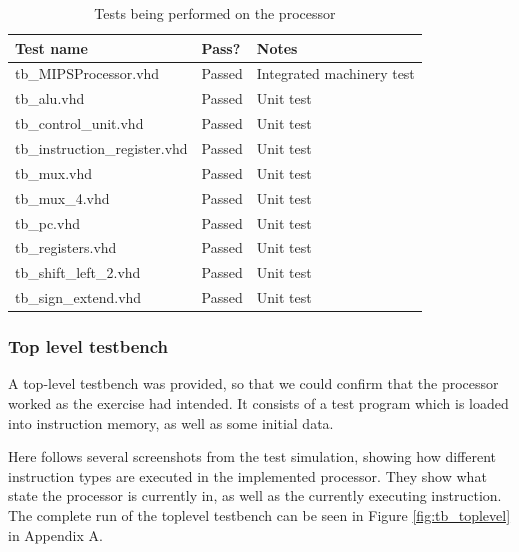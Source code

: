 \begin{table}[ht+]
    \centering
    \begin{tabular}{|l|l|l|}
        \hline
        \textbf{Test name}            & \textbf{Pass?} & \textbf{Notes}            \\ \hline
        tb\_MIPSProcessor.vhd         & Passed         & Integrated machinery test \\ \hline
        tb\_alu.vhd                   & Passed         & Unit test                 \\ \hline
        tb\_control\_unit.vhd         & Passed         & Unit test                 \\ \hline
        tb\_instruction\_register.vhd & Passed         & Unit test                 \\ \hline
        tb\_mux.vhd                   & Passed         & Unit test                 \\ \hline
        tb\_mux\_4.vhd                & Passed         & Unit test                 \\ \hline
        tb\_pc.vhd                    & Passed         & Unit test                 \\ \hline
        tb\_registers.vhd             & Passed         & Unit test                 \\ \hline
        tb\_shift\_left\_2.vhd        & Passed         & Unit test                 \\ \hline
        tb\_sign\_extend.vhd          & Passed         & Unit test                 \\ \hline
    \end{tabular}
    \caption{Tests being performed on the processor}
    \label{tab:tests}
\end{table}

\subsubsection{Top level testbench}

A top-level testbench was provided, so that we could confirm that the processor worked as the exercise had intended.
It consists of a test program which is loaded into instruction memory, as well as some initial data.

Here follows several screenshots from the test simulation, showing how different instruction types are executed in the implemented processor.
They show what state the processor is currently in, as well as the currently executing instruction.
The complete run of the toplevel testbench can be seen in Figure \ref{fig:tb_toplevel} in Appendix A.

